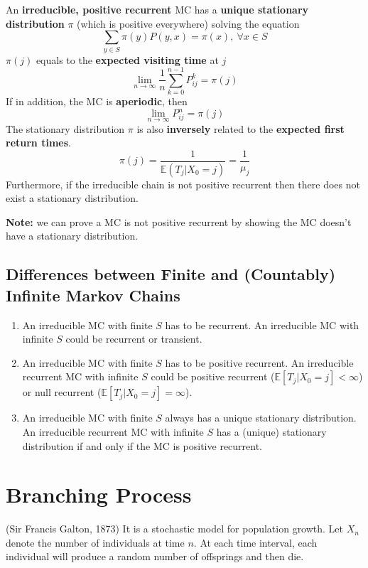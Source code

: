 \documentclass[11pt]{elegantbook}
\begin{document}
\begin{theorem}
    An \textbf{irreducible, positive recurrent} MC has a \textbf{unique stationary distribution} $\pi$ (which is positive everywhere) solving the equation
    $$\sum_{y\in S}\pi(y)P(y,x)=\pi(x),\ \forall x\in S$$
    $\pi(j)$ equals to the \textbf{expected visiting time} at $j$ $$\lim_{n \rightarrow \infty}\frac{1}{n}\sum_{k=0}^{n-1}P_{ij}^k=\pi(j)$$
    If in addition, the MC is \textbf{aperiodic}, then $$\lim_{n \rightarrow \infty}P_{ij}^n=\pi(j)$$
    The stationary distribution $\pi$ is also \textbf{inversely} related to the \textbf{expected first return times}. $$\pi(j)=\frac{1}{\mathbb{E}(T_j|X_0=j)}=\frac{1}{\mu_j}$$
    Furthermore, if the irreducible chain is not positive recurrent then there does not exist a stationary distribution.
\end{theorem}

\textbf{Note:} we can prove a MC is not positive recurrent by showing the MC doesn't have a stationary distribution.



\section{Differences between Finite and (Countably) Infinite Markov Chains}
\begin{enumerate}
    \item An irreducible MC with finite $S$ has to be recurrent. An irreducible MC with infinite $S$ could be recurrent or transient.
    \item An irreducible MC with finite $S$ has to be positive recurrent. An irreducible recurrent MC with infinite $S$ could be positive recurrent ($\mathbb{E}[T_j|X_0=j]<\infty$) or null recurrent ($\mathbb{E}[T_j|X_0=j]=\infty$).
    \item An irreducible MC with finite $S$ always has a unique stationary distribution. An irreducible recurrent MC with infinite $S$ has a (unique) stationary distribution if and only if the MC is positive recurrent.
\end{enumerate}

\chapter{Branching Process}
(Sir Francis Galton, 1873) It is a stochastic model for population growth. Let $X_n$ denote the number of individuals at time $n$. At each time interval, each individual will produce a random number of offsprings and then die.
\end{document}
